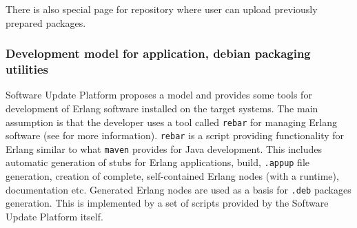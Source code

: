 There is also special page for repository where user can upload previously prepared packages.

\subsubsection{Development model for application, debian packaging utilities}

Software Update Platform proposes a model and provides some tools for development of Erlang software installed
on the target systems. The main assumption is that the developer uses a tool called {\tt rebar} for managing Erlang software (see \cite{rebar} for more information).
{\tt rebar} is a script providing functionality for Erlang similar to what {\tt maven} provides for Java development.
This includes automatic generation of stubs for Erlang applications, build, {\tt .appup} file
generation, creation of complete, self-contained Erlang nodes (with a runtime), documentation etc.
Generated Erlang nodes are used as a basis for {\tt .deb} packages generation. This is implemented by a set of
scripts provided by the Software Update Platform itself.

